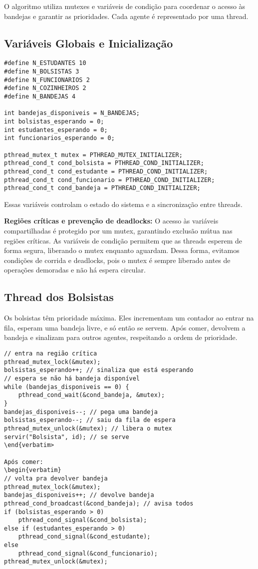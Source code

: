 \documentclass[10pt,a4paper]{article}
\begin{document}
O algoritmo utiliza mutexes e variáveis de condição para coordenar o acesso às bandejas e garantir as prioridades. Cada agente é representado por uma thread.

\subsection{Variáveis Globais e Inicialização}

\begin{verbatim}
#define N_ESTUDANTES 10
#define N_BOLSISTAS 3
#define N_FUNCIONARIOS 2
#define N_COZINHEIROS 2
#define N_BANDEJAS 4

int bandejas_disponiveis = N_BANDEJAS;
int bolsistas_esperando = 0;
int estudantes_esperando = 0;
int funcionarios_esperando = 0;

pthread_mutex_t mutex = PTHREAD_MUTEX_INITIALIZER;
pthread_cond_t cond_bolsista = PTHREAD_COND_INITIALIZER;
pthread_cond_t cond_estudante = PTHREAD_COND_INITIALIZER;
pthread_cond_t cond_funcionario = PTHREAD_COND_INITIALIZER;
pthread_cond_t cond_bandeja = PTHREAD_COND_INITIALIZER;
\end{verbatim}
Essas variáveis controlam o estado do sistema e a sincronização entre threads.

\textbf{Regiões críticas e prevenção de deadlocks:} O acesso às variáveis compartilhadas é protegido por um mutex, garantindo exclusão mútua nas regiões críticas. As variáveis de condição permitem que as threads esperem de forma segura, liberando o mutex enquanto aguardam. Dessa forma, evitamos condições de corrida e deadlocks, pois o mutex é sempre liberado antes de operações demoradas e não há espera circular.

\subsection{Thread dos Bolsistas}

Os bolsistas têm prioridade máxima. Eles incrementam um contador ao entrar na fila, esperam uma bandeja livre, e só então se servem. Após comer, devolvem a bandeja e sinalizam para outros agentes, respeitando a ordem de prioridade.

\begin{verbatim}
// entra na região crítica
pthread_mutex_lock(&mutex);
bolsistas_esperando++; // sinaliza que está esperando
// espera se não há bandeja disponível
while (bandejas_disponiveis == 0) {
    pthread_cond_wait(&cond_bandeja, &mutex);
}
bandejas_disponiveis--; // pega uma bandeja
bolsistas_esperando--; // saiu da fila de espera
pthread_mutex_unlock(&mutex); // libera o mutex
servir("Bolsista", id); // se serve
\end{verbatim>

Após comer:
\begin{verbatim}
// volta pra devolver bandeja
pthread_mutex_lock(&mutex);
bandejas_disponiveis++; // devolve bandeja
pthread_cond_broadcast(&cond_bandeja); // avisa todos
if (bolsistas_esperando > 0)
    pthread_cond_signal(&cond_bolsista);
else if (estudantes_esperando > 0)
    pthread_cond_signal(&cond_estudante);
else
    pthread_cond_signal(&cond_funcionario);
pthread_mutex_unlock(&mutex);
\end{verbatim}
\end{document}
